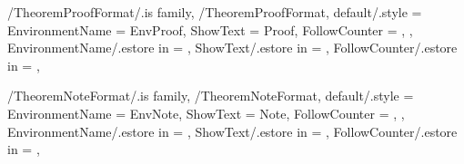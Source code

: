 \newcommand{\InitTheoremCriterionFormat}
{%
  \theoremstyle{plain}%
  \ifthenelse{\equal{\GetTheoremCriterionFormatFollowCounter}{\empty}}%
  {%
    \newtheorem{%
      \GetTheoremCriterionFormatEnvironmentName}{%
      \GetTheoremCriterionFormatShowText}%
  }%
  {%
    \MappingTheoremCounter[Criterion]{\GetTheoremCriterionFormatFollowCounter}%
    \newtheorem{%
      \GetTheoremCriterionFormatEnvironmentName}{%
      \GetTheoremCriterionFormatShowText}[%
      \GetTheoremCriterionFormatFollowCounter]%
  }%
} %


\pgfkeys
{
  /TheoremProofFormat/.is family, /TheoremProofFormat,
  default/.style =
  {
    EnvironmentName = {EnvProof},
    ShowText = {Proof},
    FollowCounter = \empty,
  },
  EnvironmentName/.estore in = \GetTheoremProofFormatEnvironmentName,
  ShowText/.estore in = \GetTheoremProofFormatShowText,
  FollowCounter/.estore in = \GetTheoremProofFormatFollowCounter,
} %

\newcommand{\InsertProof}[1]
{%
  \InsertTheoremContent[\empty]{%
    \GetTheoremProofFormatEnvironmentName}{#1}%
} %

\newcommand{\InitTheoremProofFormat}
{%
  \theoremstyle{definition}%
  \ifthenelse{\equal{\GetTheoremProofFormatFollowCounter}{\empty}}%
  {%
    \newtheorem*{%
      \GetTheoremProofFormatEnvironmentName}{%
      \GetTheoremProofFormatShowText}
  }%
  {%
    \MappingTheoremCounter[Proof]{\GetTheoremProofFormatFollowCounter}%
    \newtheorem{%
      \GetTheoremProofFormatEnvironmentName}{%
      \GetTheoremProofFormatShowText}[%
      \GetTheoremProofFormatFollowCounter]%
  }%
} %


\pgfkeys
{
  /TheoremNoteFormat/.is family, /TheoremNoteFormat,
  default/.style =
  {
    EnvironmentName = {EnvNote},
    ShowText = {Note},
    FollowCounter = \empty,
  },
  EnvironmentName/.estore in = \GetTheoremNoteFormatEnvironmentName,
  ShowText/.estore in = \GetTheoremNoteFormatShowText,
  FollowCounter/.estore in = \GetTheoremNoteFormatFollowCounter,
} %

\newcommand{\InsertNote}[1]
{%
  \InsertTheoremContent[\empty]{%
    \GetTheoremNoteFormatEnvironmentName}{#1}%
} %

\newcommand{\InitTheoremNoteFormat}
{%
  \theoremstyle{definition}%
  \ifthenelse{\equal{\GetTheoremNoteFormatFollowCounter}{\empty}}%
  {%
    \newtheorem*{%
      \GetTheoremNoteFormatEnvironmentName}{%
      \GetTheoremNoteFormatShowText}
  }%
  {%
    \MappingTheoremCounter[Note]{\GetTheoremNoteFormatFollowCounter}%
    \newtheorem{%
      \GetTheoremNoteFormatEnvironmentName}{%
      \GetTheoremNoteFormatShowText}[%
      \GetTheoremNoteFormatFollowCounter]%
  }%
} %

